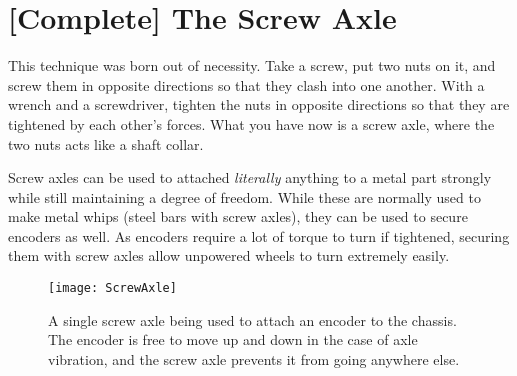 ﻿\section{[Complete] The Screw Axle}

This technique was born out of necessity. Take a screw, put two nuts on it, and screw them in opposite directions so that they clash into one another. With a wrench and a screwdriver, tighten the nuts in opposite directions so that they are tightened by each other's forces. What you have now is a screw axle, where the two nuts acts like a shaft collar.

Screw axles can be used to attached \textit{literally} anything to a metal part strongly while still maintaining a degree of freedom. While these are normally used to make metal whips (steel bars with screw axles), they can be used to secure encoders as well. As encoders require a lot of torque to turn if tightened, securing them with screw axles allow unpowered wheels to turn extremely easily.

\begin{figure}[h]
    \centering
    \texttt{[image: ScrewAxle]}
    \caption{
        A single screw axle being used to attach an encoder to the chassis. The encoder is free to move up and down in the case of axle vibration, and the screw axle prevents it from going anywhere else.
    }
\end{figure}
